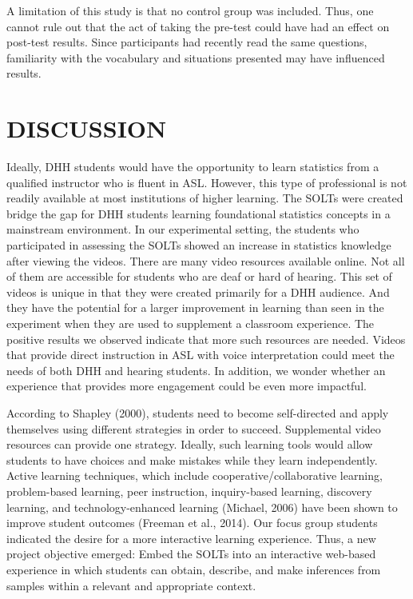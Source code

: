 \documentclass[11.5pt]{sig-alternate} %
\begin{document}
\begin{large}
A limitation of this study is that no control group was included.  Thus, one cannot rule out that the act of taking the pre-test could have had an effect on post-test results. Since participants had recently read the same questions, familiarity with the vocabulary and situations presented may have influenced results.

\section*{DISCUSSION}

Ideally, DHH students would have the opportunity to learn statistics from a qualified instructor who is fluent in ASL. However, this type of professional is not readily available at most institutions of higher learning. The SOLTs were created bridge the gap for DHH students learning foundational statistics concepts in a mainstream environment. In our experimental setting, the students who participated in assessing the SOLTs showed an increase in statistics knowledge after viewing the videos. There are many video resources available online. Not all of them are accessible for students who are deaf or hard of hearing. This set of videos is unique in that they were created primarily for a DHH audience. And they have the potential for a larger improvement in learning than seen in the experiment when they are used to supplement a classroom experience. The positive results we observed indicate that more such resources are needed. Videos that provide direct instruction in ASL with voice interpretation could meet the needs of both DHH and hearing students. In addition, we wonder whether an experience that provides more engagement could be even more impactful.

According to Shapley (2000), students need to become self-directed and apply themselves using different strategies in order to succeed. Supplemental video resources can provide one strategy. Ideally, such learning tools would allow students to have choices and make mistakes while they learn independently. Active learning techniques, which include cooperative/collaborative learning, problem-based learning, peer instruction, inquiry-based learning, discovery learning, and technology-enhanced learning (Michael, 2006) have been shown to improve student outcomes (Freeman et al., 2014). Our focus group students indicated the desire for a more interactive learning experience. Thus, a new project objective emerged: Embed the SOLTs into an interactive web-based experience in which students can obtain, describe, and make inferences from samples within a relevant and appropriate context.


\end{large}
\end{document}
